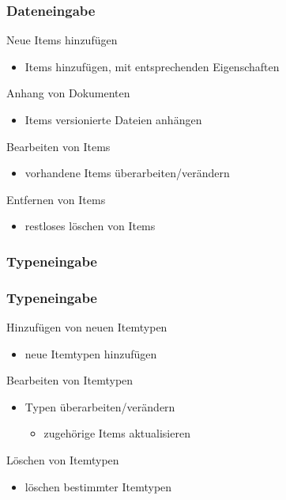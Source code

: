 \documentclass{beamer}
\begin{document}
\begin{frame}
\frametitle{Dateneingabe}

\begin{block}{Neue Items hinzufügen}
\begin{itemize}
\item Items hinzufügen, mit entsprechenden Eigenschaften
\end{itemize}
\end{block}

\begin{block}{Anhang von Dokumenten}
\begin{itemize}
\item Items versionierte Dateien anhängen
\end{itemize}
\end{block}

\begin{block}{Bearbeiten von Items}
\begin{itemize}
\item vorhandene Items überarbeiten/verändern
\end{itemize}
\end{block}

\begin{block}{Entfernen von Items}
\begin{itemize}
\item restloses löschen von Items
\end{itemize}
\end{block}

\end{frame}

\subsubsection{Typeneingabe}

\begin{frame}
\frametitle{Typeneingabe}

\begin{block}{Hinzufügen von neuen Itemtypen}
\begin{itemize}
\item neue Itemtypen hinzufügen
\end{itemize}
\end{block}

\begin{block}{Bearbeiten von Itemtypen}
\begin{itemize}
\item Typen überarbeiten/verändern
\begin{itemize}
\item zugehörige Items aktualisieren
\end{itemize}
\end{itemize}
\end{block}

\begin{block}{Löschen von Itemtypen}
\begin{itemize}
\item löschen bestimmter Itemtypen
\end{itemize}
\end{block}

\end{frame}
\end{document}
